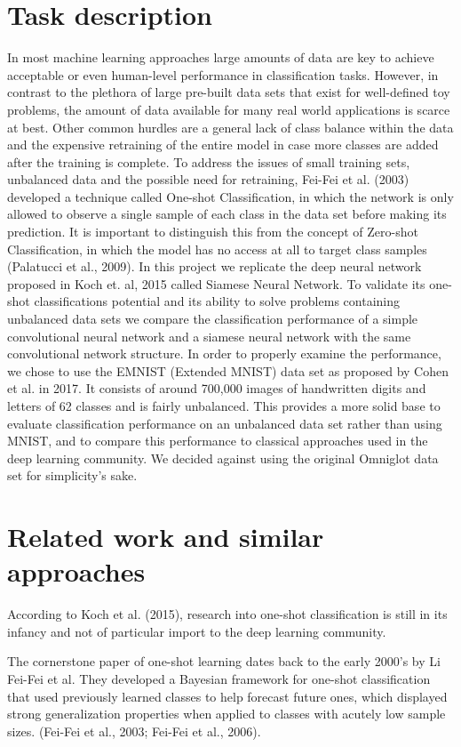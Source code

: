 ﻿\documentclass[a4paper,pt12]{article}
\begin{document}
\section{Task description}
In most machine learning approaches large amounts of data are key to achieve acceptable or even human-level performance in classification tasks.
However, in contrast to the plethora of large pre-built data sets that exist for well-defined toy problems, the amount of data available for many real world applications is scarce at best. Other common hurdles are a general lack of class balance within the data and the expensive retraining of the entire model in case more classes are added after the training is complete.
To address the issues of small training sets, unbalanced data and the possible need for retraining, Fei-Fei et al. (2003) developed a technique called One-shot Classification, in which the network is only allowed to observe a single sample of each class in the data set before making its prediction. It is important to distinguish this from the concept of Zero-shot Classification, in which the model has no access at all to target class samples (Palatucci et al., 2009).
In this project we replicate the deep neural network proposed in Koch et. al, 2015 called Siamese Neural Network. To validate its one-shot classifications potential and its ability to solve problems containing unbalanced data sets we compare the classification performance of a simple convolutional neural network and a siamese neural network with the same convolutional network structure.
In order to properly examine the performance, we chose to use the EMNIST (Extended MNIST) data set as proposed by Cohen et al. in 2017. It consists of around 700,000 images of handwritten digits and letters of 62 classes and is fairly unbalanced. This provides a more solid base to evaluate classification performance on an unbalanced data set rather than using MNIST, and to compare this performance to classical approaches used in the deep learning community. We decided against using the original Omniglot data set for simplicity's sake.


\section{Related work and similar approaches}
According to Koch et al. (2015), research into one-shot classification is still in its infancy and not of particular import to the deep learning community.

The cornerstone paper of one-shot learning dates back to the early 2000's by Li Fei-Fei et al. They developed a Bayesian framework for one-shot classification that used previously learned classes to help forecast future ones, which displayed strong generalization properties when applied to classes with acutely low sample sizes. (Fei-Fei et al., 2003; Fei-Fei et al., 2006).
\end{document}
